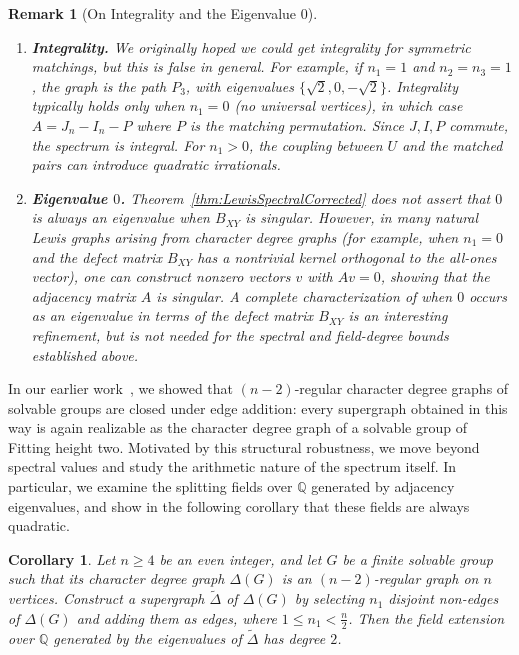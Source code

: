 \documentclass[11pt]{amsart}
\newtheorem{cor}[thm]{\bf Corollary}
\newtheorem{rem}[thm]{\bf Remark}
\begin{document}
\begin{rem}[On Integrality and the Eigenvalue $0$]\label{rem:integrality-zero}
\begin{enumerate}
    \item \textbf{Integrality.} 
    We originally hoped we could get integrality for symmetric matchings, but this is false in general. For example, if $n_1=1$ and $n_2=n_3=1$, the graph is the path $P_3$, with eigenvalues $\{ \sqrt{2}, 0, -\sqrt{2} \}$. Integrality typically holds only when $n_1=0$ (no universal vertices), in which case $A = J_n - I_n - P$ where $P$ is the matching permutation. Since $J, I, P$ commute, the spectrum is integral. For $n_1 > 0$, the coupling between $U$ and the matched pairs can introduce quadratic irrationals.
    \item \textbf{Eigenvalue $0$.} 
    Theorem~\ref{thm:LewisSpectralCorrected} does not assert that $0$ is always an eigenvalue when $B_{XY}$ is singular. However, in many natural Lewis graphs arising from character degree graphs (for example, when $n_1=0$ and the defect matrix $B_{XY}$ has a nontrivial kernel orthogonal to the all-ones vector), one can construct nonzero vectors $v$ with $Av=0$, showing that the adjacency matrix $A$ is singular. A complete characterization of when $0$ occurs as an eigenvalue in terms of the defect matrix $B_{XY}$ is an interesting refinement, but is not needed for the spectral and field-degree bounds established above.
\end{enumerate}
\end{rem}

In our earlier work~\cite{Sivanesan2026}, we showed that $(n\!-\!2)$-regular character degree graphs of solvable groups are closed under edge addition: every supergraph obtained in this way is again realizable as the character degree graph of a solvable group of Fitting height two. Motivated by this structural robustness, we move beyond spectral values and study the arithmetic nature of the spectrum itself. In particular, we examine the splitting fields over $\mathbb{Q}$ generated by adjacency eigenvalues, and show in the following corollary that these fields are always quadratic.

\begin{cor}\label{cor:quadratic}
Let $n \ge 4$ be an even integer, and let $G$ be a finite solvable group such that its character degree graph $\Delta(G)$ is an $(n-2)$-regular graph on $n$ vertices. Construct a supergraph $\widetilde{\Delta}$ of $\Delta(G)$ by selecting $n_1$ disjoint non-edges of $\Delta(G)$ and adding them as edges, where $1 \le n_1 < \frac{n}{2}$. Then the field extension over $\mathbb{Q}$ generated by the eigenvalues of $\widetilde{\Delta}$ has degree $2$.
\end{cor}
\end{document}

